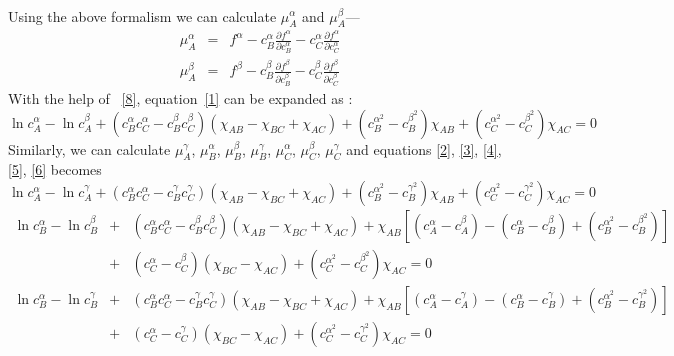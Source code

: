 \documentclass[12pt]{iiscthes}
\theoremstyle{definition}
\theoremstyle{definition}
\theoremstyle{remark}
\begin{document}
\begin{appendices}
\begin{eqnarray}
\end{eqnarray} 
Using the above formalism we can calculate $ \mu_A^\alpha $ and $ \mu_A^\beta $---
\begin{eqnarray}\label{8}
\mu_A^\alpha &=& f^\alpha-c_B^\alpha\frac{\partial f^\alpha}{\partial c_B^\alpha}-c_C^\alpha\frac{\partial f^\alpha}{\partial c_C^\alpha}\nonumber\\
\mu_A^\beta &=& f^\beta - c_B^\beta\frac{\partial f^\beta}{\partial c_B^\beta}-c_C^\beta\frac{\partial f^\beta}{\partial c_C^\beta}
\end{eqnarray}
With the help of ~\ref{8}, equation~\ref{1} can be expanded as :
\begin{equation}\label{f1}
\ln c_A^\alpha-\ln c_A^\beta+\left(c_B^\alpha c_C^\alpha - c_B^\beta c_C^\beta\right)\left(\chi_{AB}-\chi_{BC}+\chi_{AC}\right)+\left(c_B^{\alpha^2}-c_B^{\beta^2}\right)\chi_{AB}+\left(c_C^{\alpha^2}-c_C^{\beta^2}\right)\chi_{AC} = 0
\end{equation} 
Similarly, we can calculate $ \mu_A^\gamma $, $ \mu_B^\alpha $, $ \mu_B^\beta $, $ \mu_B^\gamma $, $ \mu_C^\alpha $, $ \mu_C^\beta $, $ \mu_C^\gamma $ and equations \ref{2}, \ref{3}, \ref{4}, \ref{5}, \ref{6} becomes
 \begin{equation}\label{f2}
\ln c_A^\alpha-\ln c_A^\gamma+\left(c_B^\alpha c_C^\alpha - c_B^\gamma c_C^\gamma\right)\left(\chi_{AB}-\chi_{BC}+\chi_{AC}\right)+\left(c_B^{\alpha^2}-c_B^{\gamma^2}\right)\chi_{AB}+\left(c_C^{\alpha^2}-c_C^{\gamma^2}\right)\chi_{AC} = 0
\end{equation} 
\begin{eqnarray}\label{f3}
\ln c_B^\alpha-\ln c_B^\beta&+&\left(c_B^\alpha c_C^\alpha - c_B^\beta c_C^\beta\right)\left(\chi_{AB}-\chi_{BC}+\chi_{AC}\right)+\chi_{AB}\left[\left(c_A^\alpha-c_A^\beta\right)-\left(c_B^\alpha-c_B^\beta\right)+\left(c_B^{\alpha^2}-c_B^{\beta^2}\right)\right]\nonumber\\
&+&\left(c_C^\alpha-c_C^\beta\right)\left(\chi_{BC}-\chi_{AC}\right)+\left(c_C^{\alpha^2}-c_C^{\beta^2}\right)\chi_{AC} = 0
\end{eqnarray} 
\begin{eqnarray}\label{f4}
\ln c_B^\alpha-\ln c_B^\gamma&+&\left(c_B^\alpha c_C^\alpha - c_B^\gamma c_C^\gamma\right)\left(\chi_{AB}-\chi_{BC}+\chi_{AC}\right)+\chi_{AB}\left[\left(c_A^\alpha-c_A^\gamma\right)-\left(c_B^\alpha-c_B^\gamma\right)+\left(c_B^{\alpha^2}-c_B^{\gamma^2}\right)\right]\nonumber\\
&+&\left(c_C^\alpha-c_C^\gamma\right)\left(\chi_{BC}-\chi_{AC}\right)+\left(c_C^{\alpha^2}-c_C^{\gamma^2}\right)\chi_{AC} = 0

\end{eqnarray}
\end{appendices}
\end{document}
